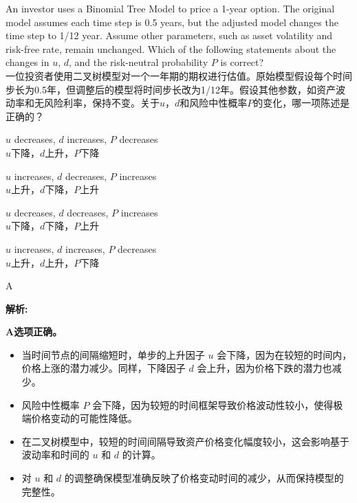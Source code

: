 \documentclass{article}
\newcounter{question} %
\newenvironment{explanation}
{\textbf{解析:}\par}
{\par}
\begin{document}
\begin{question}
    An investor uses a Binomial Tree Model to price a 1-year option. The original model assumes each time step is 0.5 years, but the adjusted model changes the time step to 1/12 year. Assume other parameters, such as asset volatility and risk-free rate, remain unchanged. Which of the following statements about the changes in \( u \), \( d \), and the risk-neutral probability \( P \) is correct?\\
    一位投资者使用二叉树模型对一个一年期的期权进行估值。原始模型假设每个时间步长为0.5年，但调整后的模型将时间步长改为1/12年。假设其他参数，如资产波动率和无风险利率，保持不变。关于\( u \)，\( d \)和风险中性概率\( P \)的变化，哪一项陈述是正确的？
    \end{question}
    
    \begin{choices}
    \item \( u \) decreases, \( d \) increases, \( P \) decreases\\
    \( u \)下降，\( d \)上升，\( P \)下降
    \item \( u \) increases, \( d \) decreases, \( P \) increases\\
    \( u \)上升，\( d \)下降，\( P \)上升
    \item \( u \) decreases, \( d \) decreases, \( P \) increases\\
    \( u \)下降，\( d \)下降，\( P \)上升
    \item \( u \) increases, \( d \) increases, \( P \) decreases\\
    \( u \)上升，\( d \)上升，\( P \)下降
    \end{choices}
    
    \begin{correctanswer}
    A
    \end{correctanswer}
    
    \begin{explanation}
        \textbf{A选项正确。}
        \begin{itemize}
        \item 当时间节点的间隔缩短时，单步的上升因子 \( u \) 会下降，因为在较短的时间内，价格上涨的潜力减少。同样，下降因子 \( d \) 会上升，因为价格下跌的潜力也减少。
        \item 风险中性概率 \( P \) 会下降，因为较短的时间框架导致价格波动性较小，使得极端价格变动的可能性降低。
        \item 在二叉树模型中，较短的时间间隔导致资产价格变化幅度较小，这会影响基于波动率和时间的 \( u \) 和 \( d \) 的计算。
        \item 对 \( u \) 和 \( d \) 的调整确保模型准确反映了价格变动时间的减少，从而保持模型的完整性。
        \end{itemize}
    \end{explanation}
\end{document}
